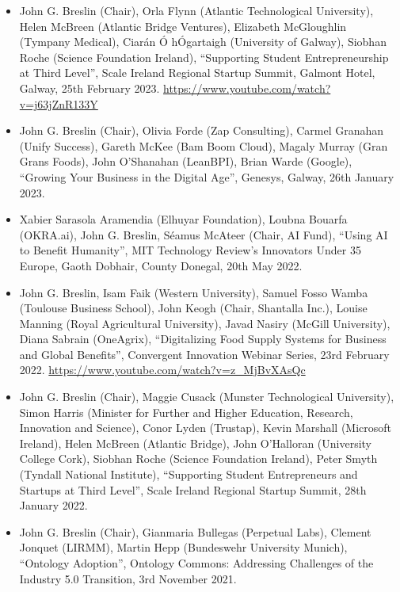 \documentclass[10pt,a4paper]{res} %
\begin{document}
\begin{resume}
\begin{itemize} \itemsep -2pt
\item John G. Breslin (Chair), Orla Flynn (Atlantic Technological University), Helen McBreen (Atlantic Bridge Ventures), Elizabeth McGloughlin (Tympany Medical), Ciar\'{a}n \'{O} h\'{O}gartaigh (University of Galway), Siobhan Roche (Science Foundation Ireland), ``Supporting Student Entrepreneurship at Third Level'', Scale Ireland Regional Startup Summit, Galmont Hotel, Galway, 25th February 2023. \url{https://www.youtube.com/watch?v=j63jZnR133Y}
\item John G. Breslin (Chair), Olivia Forde (Zap Consulting), Carmel Granahan (Unify Success), Gareth McKee (Bam Boom Cloud), Magaly Murray (Gran Grans Foods), John O'Shanahan (LeanBPI), Brian Warde (Google), ``Growing Your Business in the Digital Age'', Genesys, Galway, 26th January 2023.
\item Xabier Sarasola Aramendia (Elhuyar Foundation), Loubna Bouarfa (OKRA.ai), John G. Breslin, S\'{e}amus McAteer (Chair, AI Fund), ``Using AI to Benefit Humanity'', MIT Technology Review's Innovators Under 35 Europe, Gaoth Dobhair, County Donegal, 20th May 2022. %
\item John G. Breslin, Isam Faik (Western University), Samuel Fosso Wamba (Toulouse Business School), John Keogh (Chair, Shantalla Inc.), Louise Manning (Royal Agricultural University), Javad Nasiry (McGill University), Diana Sabrain (OneAgrix), ``Digitalizing Food Supply Systems for Business and Global Benefits'', Convergent Innovation Webinar Series, 23rd February 2022. \url{https://www.youtube.com/watch?v=z_MjBvXAsQc} %
\item John G. Breslin (Chair), Maggie Cusack (Munster Technological University), Simon Harris (Minister for Further and Higher Education, Research, Innovation and Science), Conor Lyden (Trustap), Kevin Marshall (Microsoft Ireland), Helen McBreen (Atlantic Bridge), John O'Halloran (University College Cork), Siobhan Roche (Science Foundation Ireland), Peter Smyth (Tyndall National Institute), ``Supporting Student Entrepreneurs and Startups at Third Level'', Scale Ireland Regional Startup Summit, 28th January 2022.
\item John G. Breslin (Chair), Gianmaria Bullegas (Perpetual Labs), Clement Jonquet (LIRMM), Martin Hepp (Bundeswehr University Munich), ``Ontology Adoption'', Ontology Commons: Addressing Challenges of the Industry 5.0 Transition, 3rd November 2021.

\end{itemize}
\end{resume}
\end{document}
